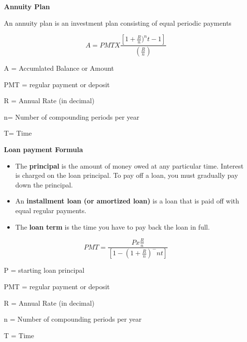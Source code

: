 \documentclass{article}
\begin{document}
\begin{center}
	\textbf{Annuity Plan}
\end{center}
 
 An annuity plan is an investment plan consisting of equal periodic payments
 
 \begin{center}
 	\begin{equation}
 		A = PMT X \frac{[1 + \frac{R}{n})^nt - 1]}{(\frac{R}{n})}
 	\end{equation}
 \end{center}
\begin{center}
	A = Accumlated Balance or Amount
	
	PMT = regular payment or deposit
	
	R = Annual Rate (in decimal)
	
	n= Number of compounding periods per year
	
	T= Time
\end{center}

\newpage
\begin{center}
	\textbf{Loan payment Formula}
\end{center}
\begin{itemize}
	\item The \textbf{principal} is the amount of money owed at any particular time. Interest is charged on the loan principal. To pay off a loan, you must gradually pay down the principal.
	
	\item An \textbf{ installment loan (or amortized loan)} is a loan that is paid off with equal regular payments.
	
	\item The \textbf{loan term} is the time you have to pay back the loan in full.
\end{itemize}

\begin{center}
	 \begin{equation}
	 	PMT = \frac{P x \frac{R}{n}}{[1 - ( 1 + \frac{R}{n})^-nt]}
	 \end{equation}
\end{center}


\begin{flushright}
	P = starting loan principal
	
	PMT  = regular payment  or deposit
	
	R = Annual Rate (in decimal)
	
	n = Number of compounding periods per year
	
	T = Time
	
\end{flushright}
\end{document}

